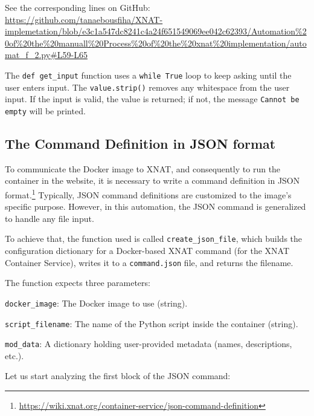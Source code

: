 

\noindent\footnotesize See the corresponding lines on GitHub:\url{ https://github.com/tanaebousfiha/XNAT-implemetation/blob/e3c1a547dc8241c4a24f651549069ee042c62393/Automation%20of%20the%20manuall%20Process%20of%20the%20xnat%20implementation/automat_f_2.py#L59-L65}


The \texttt{def get\_input} function uses a \texttt{while True} loop to keep asking until the user enters input. The \texttt{value.strip()} removes any whitespace from the user input. If the input is valid, the value is returned; if not, the message \texttt{Cannot be empty} will be printed.

\subsection{The Command Definition in JSON format}

To communicate the Docker image to XNAT, and consequently to run the container in the website, it is necessary to write a command definition in JSON format.\footnote{\url{ https://wiki.xnat.org/container-service/json-command-definition}}
Typically, JSON command definitions are customized to the image's specific purpose. However, in this automation, the JSON command is generalized to handle any file input.

To achieve that, the function used is called \texttt{create\_json\_file}, which builds the configuration dictionary for a Docker-based XNAT command (for the XNAT Container Service), writes it to a \texttt{command.json} file, and returns the filename.

The function expects three parameters:

\texttt{docker\_image}: The Docker image to use (string).

\texttt{script\_filename}: The name of the Python script inside the container (string).

\texttt{mod\_data}: A dictionary holding user-provided metadata (names, descriptions, etc.).

Let us start analyzing the first block of the JSON command:





